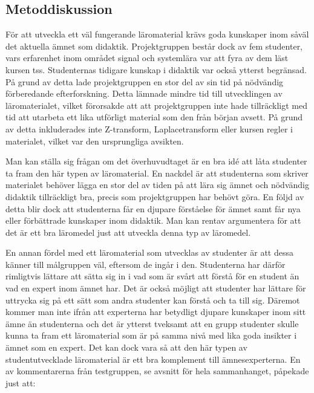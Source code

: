 \documentclass[12pt,a4paper,twoside,openright]{article}
\begin{document}
\subsection{Metoddiskussion}
\label{sec:metDisk}
För att utveckla ett väl fungerande läromaterial krävs goda kunskaper
inom såväl det aktuella ämnet som didaktik. Projektgruppen består dock
av fem studenter, vars erfarenhet inom området signal och systemlära
var att fyra av dem läst kursen \gls{tss}. Studenternas tidigare
kunskap i didaktik var också ytterst begränsad. På grund av detta lade
projekt\-gruppen en stor del av sin tid på nödvändig förberedande
efterforskning. Detta lämnade mindre tid till utvecklingen av
läromaterialet, vilket förorsakde att att projektgruppen inte hade
tillräckligt med tid att utarbeta ett lika utförligt material som den från
början avsett. På grund av detta inkluderades inte Z-transform,
Laplacetransform eller kursen \gls{regler} i materialet, vilket var den
ursprungliga avsikten.

Man kan ställa sig frågan om det överhuvudtaget är en bra idé att låta
studenter ta fram den här typen av läromaterial. En nackdel är att
studenterna som skriver materialet behöver lägga en stor del av tiden
på att lära sig ämnet och nödvändig didaktik tillräckligt bra, precis
som projektgruppen har behövt göra.  En följd av detta blir dock att
studenterna får en djupare förståelse för ämnet samt får nya eller
förbättrade kunskaper inom didaktik.  Man kan rentav argumentera för
att det är ett bra läromedel just att utveckla denna typ av läromedel.

En annan fördel med ett läromaterial som utvecklas av studenter är att
dessa känner till målgruppen väl, eftersom de ingår
i den. Studenterna har därför rimligtvis lättare att sätta sig in i
vad som är svårt att förstå för en student än vad en expert inom ämnet
har. Det är också möjligt att studenter har lättare för uttrycka sig
på ett sätt som andra studenter kan förstå och ta till sig. Däremot
kommer man inte ifrån att experterna har betydligt djupare kunskaper
inom sitt ämne än studenterna och det är ytterst tveksamt att en grupp
studenter skulle kunna ta fram ett läromaterial som är på samma nivå
med lika goda insikter i ämnet som en expert. Det kan dock vara så att
den här typen av studentutvecklade läromaterial är ett bra komplement
till ämnesexperterna. En av kommentarerna från testgruppen, se avsnitt
 för hela sammanhanget, påpekade just att:
\end{document}
